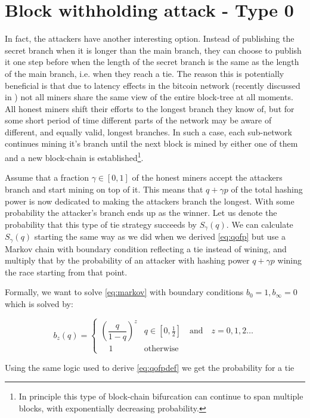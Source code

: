 \documentclass[letterpaper,12pt]{report}
\theoremstyle{plain}
\theoremstyle{definition}
\begin{document}
\section{Block withholding attack - Type 0}
In fact, the attackers have another interesting option. Instead of publishing the secret branch when it is longer than the main branch, they can choose to publish it one step before when the length of the secret branch is the same as the length of the main branch, i.e. when they reach a tie. The reason this is potentially beneficial is that due to latency effects in the bitcoin network (recently discussed in \cite{Zoharetal}) not all miners share the same view of the entire block-tree at all moments. All honest miners shift their efforts to the longest branch they know of, but for some short period of time different parts of the network may be aware of different, and equally valid, longest branches. In such a case, each sub-network continues mining it's branch until the next block is mined by either one of them and a new block-chain is established\footnote{In principle this type of block-chain bifurcation can continue to span multiple blocks, with exponentially decreasing probability.}. 

Assume that a fraction $\gamma \in [0,1]$ of the honest miners accept the attackers branch and start mining on top of it. This means that $q+\gamma p$ of the total hashing power is now dedicated to making the attackers branch the longest. With some probability the attacker's branch ends up as the winner. Let us denote the probability that this type of tie strategy succeeds by $S_{\gamma}(q)$.
We can calculate $S_{\gamma}(q)$ starting the same way as we did when we derived \ref{eq:qofp} but use a Markov chain with boundary condition reflecting a tie instead of wining, and multiply that by the probability of an attacker with hashing power $q+\gamma p$ wining the race starting from that point.

Formally, we want to solve \ref{eq:markov} with boundary conditions $b_0=1, b_\infty=0$ which is solved by:

\begin{equation}\label{eq:bz}
\mathit{b}_z(q)=\begin{cases}\left( \dfrac{q}{1-q}\right)^z & q\in [0,\frac{1}{2}] \quad \mathrm{and} \quad z=0,1,2\dots \\ \quad 1 & \mathrm{otherwise} \end{cases}
\end{equation}

Using the same logic used to derive \ref{eq:qofpdef} we get the probability for a tie
\end{document}
